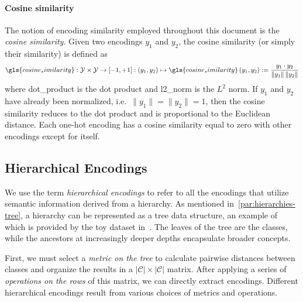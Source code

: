 \paragraph{Cosine similarity} The notion of encoding similarity employed throughout this document is the \emph{cosine similarity}. Given two encodings $y_1$ and $y_2$, the cosine similarity (or simply their similarity) is defined as
\begin{equation}
  \gls{cosine_similarity}: \mathcal{Y} \times \mathcal{Y} \to \left[-1, +1\right]
  : (y_1, y_2) \mapsto \gls{cosine_similarity} \,(y_1, y_2) :=
  \frac{y_1 \cdot y_2}{\|y_1\| \, \|y_2\|}
  \label{eq:cosine-similarity}
\end{equation}
where \gls{dot_product} is the dot product and \gls{l2_norm} is the $L^2$ norm.
If $y_1$ and $y_2$ have already been normalized, i.e.\ $\|y_1\| = \|y_2\| = 1$, then the cosine similarity reduces to the dot product and is proportional to the Euclidean distance. Each one-hot encoding has a cosine similarity equal to zero with other encodings except for itself.


\subsection{Hierarchical Encodings}
\label{subsec:hierarchical-encodings}

We use the term \emph{hierarchical encodings} to refer to all the encodings that utilize semantic information derived from a hierarchy. As mentioned in~\cref{par:hierarchies-tree}, a hierarchy can be represented as a tree data structure, an example of which is provided by the toy dataset in~. The leaves of the tree are the classes, while the ancestors at increasingly deeper depths encapsulate broader concepts.

First, we must select a \emph{metric on the tree} to calculate pairwise distances between classes and organize the results in a $|\mathcal{C}| \times |\mathcal{C}|$ matrix. After applying a series of \emph{operations on the rows} of this matrix, we can directly extract encodings. Different hierarchical encodings result from various choices of metrics and operations.

